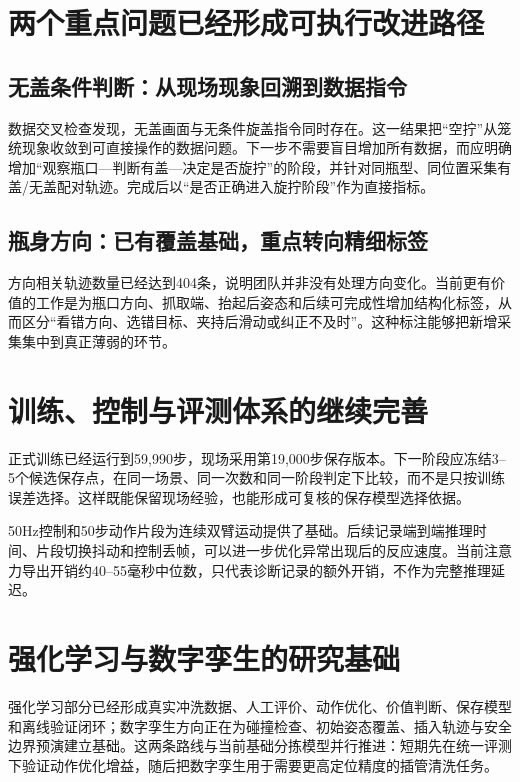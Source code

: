 \section{两个重点问题已经形成可执行改进路径}

\subsection{无盖条件判断：从现场现象回溯到数据指令}

数据交叉检查发现，无盖画面与无条件旋盖指令同时存在。这一结果把“空拧”从笼统现象收敛到可直接操作的数据问题。下一步不需要盲目增加所有数据，而应明确增加“观察瓶口—判断有盖—决定是否旋拧”的阶段，并针对同瓶型、同位置采集有盖/无盖配对轨迹。完成后以“是否正确进入旋拧阶段”作为直接指标。

\subsection{瓶身方向：已有覆盖基础，重点转向精细标签}

方向相关轨迹数量已经达到404条，说明团队并非没有处理方向变化。当前更有价值的工作是为瓶口方向、抓取端、抬起后姿态和后续可完成性增加结构化标签，从而区分“看错方向、选错目标、夹持后滑动或纠正不及时”。这种标注能够把新增采集集中到真正薄弱的环节。

\section{训练、控制与评测体系的继续完善}

正式训练已经运行到59,990步，现场采用第19,000步保存版本。下一阶段应冻结3--5个候选保存点，在同一场景、同一次数和同一阶段判定下比较，而不是只按训练误差选择。这样既能保留现场经验，也能形成可复核的保存模型选择依据。

50Hz控制和50步动作片段为连续双臂运动提供了基础。后续记录端到端推理时间、片段切换抖动和控制丢帧，可以进一步优化异常出现后的反应速度。当前注意力导出开销约40--55毫秒中位数，只代表诊断记录的额外开销，不作为完整推理延迟。

\section{强化学习与数字孪生的研究基础}

强化学习部分已经形成真实冲洗数据、人工评价、动作优化、价值判断、保存模型和离线验证闭环；数字孪生方向正在为碰撞检查、初始姿态覆盖、插入轨迹与安全边界预演建立基础。这两条路线与当前基础分拣模型并行推进：短期先在统一评测下验证动作优化增益，随后把数字孪生用于需要更高定位精度的插管清洗任务。

